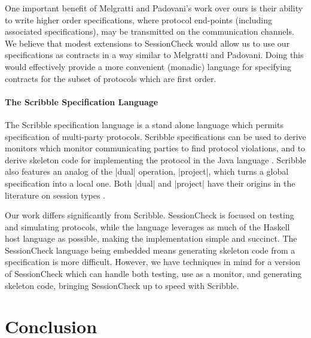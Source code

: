 \documentclass{article}
\begin{document}
One important benefit of Melgratti and Padovani's work over ours is
their ability to write higher order specifications, where protocol
end-points (including associated specifications), may be transmitted
on the communication channels.
%
We believe that modest extensions to SessionCheck would allow us to
use our specifications as contracts in a way similar to Melgratti and
Padovani.
%
Doing this would effectively provide a more convenient (monadic)
language for specifying contracts for the subset of protocols which
are first order.
%

\paragraph{The Scribble Specification Language}
%
The Scribble specification language \cite{Scribble} is a stand alone language
which permits specification of multi-party protocols.
%
Scribble specifications can be used to derive monitors which monitor communicating
parties to find protocol violations, and to derive skeleton code for implementing
the protocol in the Java language \cite{Java}.
%
Scribble also features an analog of the |dual| operation, |project|, which turns a
global specification into a local one.
%
Both |dual| and |project| have their origins in the literature on session types
\cite{HondaSessionTypes, WadlerSessionTypes}.

Our work differs significantly from Scribble.
%
SessionCheck is focused on testing and simulating protocols, while the language
leverages as much of the Haskell host language as possible, making the implementation
simple and succinct.
%
The SessionCheck language being embedded means generating skeleton code from a
specification is more difficult.
%
However, we have techniques in mind for a version of SessionCheck which can handle
both testing, use as a monitor, and generating skeleton code, bringing SessionCheck
up to speed with Scribble.
%

\section{Conclusion}




\end{document}

